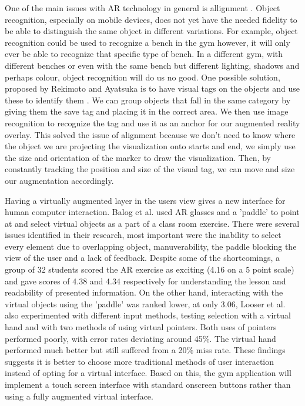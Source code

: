 \documentclass{l4proj}
\begin{document}
One of the main issues with AR technology in general is allignment \cite{sood_pro_2012}. Object recognition, especially on mobile devices, does not yet have the needed fidelity to be able to distinguish the same object in different variations. For example, object recognition could be used to recognize a bench in the gym however, it will only ever be able to recognize that specific type of bench. In a different gym, with different benches or even with the same bench but different lighting, shadows and perhaps colour, object recognition will do us no good. One possible solution, proposed by Rekimoto and Ayatsuka is to have visual tags on the objects and use these to identify them \cite{rekimoto_cybercode:_2000}. We can group objects that fall in the same category by giving them the save tag and placing it in the correct area. We then use image recognition to recognize the tag and use it as an anchor for our augmented reality overlay. This solved the issue of alignment because we don't need to know where the object we are projecting the visualization onto starts and end, we simply use the size and orientation of the marker to draw the visualization. Then, by constantly tracking the position and size of the visual tag, we can move and size our augmentation accordingly.  

Having a virtually augmented layer in the users view gives a new interface for human computer interaction. Balog et al. used AR glasses and a 'paddle' to point at and select virtual objects as a part of a class room exercise. There were several issues identified in their research, most important were the inability to select every element due to overlapping object, manuverability, the paddle blocking the view of the user and a lack of feedback\cite{balog_augmented_2007}. Despite some of the shortcomings, a group of 32 students scored the AR exercise as exciting (4.16 on a 5 point scale) and gave scores of 4.38 and 4.34 respectively for understanding the lesson and readability of presented information\cite{looser_evaluation_2007}. On the other hand, interacting with the virtual objects using the 'paddle' was ranked lower, at only 3.06\cite{balog_augmented_2007}, Looser et al. also experimented with different input methods, testing selection with a virtual hand and with two methods of using virtual pointers\cite{looser_evaluation_2007}. Both uses of pointers performed poorly, with error rates deviating around 45\%\cite{looser_evaluation_2007}. The virtual hand performed much better but still suffered from a 20\% miss rate\cite{looser_evaluation_2007}. These findings suggests it is better to choose  more traditional methods of user interaction instead of opting for a virtual interface. Based on this, the gym application will implement a touch screen interface with standard onscreen buttons rather than using a fully augmented virtual interface. 
\end{document}
